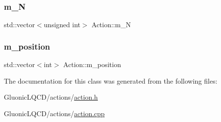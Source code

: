 \subsubsection{\texorpdfstring{m\_N}{m\_N}}
{\footnotesize\ttfamily std\+::vector$<$unsigned int$>$ Action\+::m\+\_\+N\hspace{0.3cm}{\ttfamily [protected]}}

\mbox{\label{class_action_a133fd17c83db233423855178bc81fb16}} 
\subsubsection{\texorpdfstring{m\_position}{m\_position}}
{\footnotesize\ttfamily std\+::vector$<$int$>$ Action\+::m\+\_\+position\hspace{0.3cm}{\ttfamily [protected]}}



The documentation for this class was generated from the following files\+:\begin{DoxyCompactItemize}
\item 
Gluonic\+L\+Q\+C\+D/actions/\mbox{\hyperlink{action_8h}{action.\+h}}\item 
Gluonic\+L\+Q\+C\+D/actions/\mbox{\hyperlink{action_8cpp}{action.\+cpp}}\end{DoxyCompactItemize}
